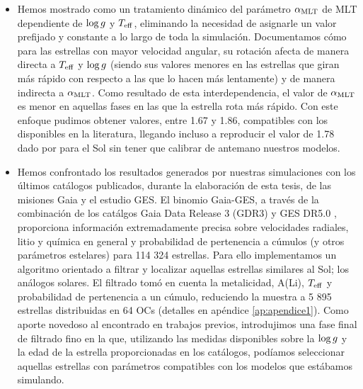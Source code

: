 \begin{itemize}
    \item Hemos mostrado como un tratamiento dinámico del parámetro $\alpha_{\mathrm{MLT}}$ de MLT dependiente de $\mathrm{log} \, g$ y $T_{\mathrm{eff}}$, eliminando la necesidad de asignarle un valor prefijado y constante a lo largo de toda la simulación. Documentamos cómo para las estrellas con mayor velocidad angular, su rotación afecta de manera directa a $T_{\mathrm{eff}}$ y $\mathrm{log} \, g$ (siendo sus valores menores en las estrellas que giran más rápido con respecto a las que lo hacen más lentamente) y de manera indirecta a $\alpha_{\mathrm{MLT}}$. Como resultado de esta interdependencia, el valor de $\alpha_{\mathrm{MLT}}$ es menor en aquellas fases en las que la estrella rota más rápido. Con este enfoque pudimos obtener valores, entre 1.67 y 1.86, compatibles con los disponibles en la literatura, llegando incluso a reproducir el valor de 1.78 dado por \cite{Sonoi2018} para el Sol sin tener que calibrar de antemano nuestros modelos.
    \item Hemos confrontado los resultados generados por nuestras simulaciones con los últimos catálogos publicados, durante la elaboración de esta tesis, de las misiones Gaia y el estudio GES. El binomio Gaia-GES, a través de la combinación de los catálgos Gaia Data Release 3 (GDR3) \citep{Brown2022} y GES DR5.0 \citep{Gilmore2022}, proporciona información extremadamente precisa sobre velocidades radiales, litio y química en general y probabilidad de pertenencia a cúmulos (y otros parámetros estelares) para 114 324 estrellas. Para ello implementamos un algoritmo orientado a filtrar y localizar aquellas estrellas similares al Sol; los análogos solares. El filtrado tomó en cuenta la metalicidad, A(Li), $T_{\mathrm{eff}}$ y probabilidad de pertenencia a un cúmulo, reduciendo la muestra a 5 895 estrellas distribuidas en 64 OCs (detalles en apéndice \ref{ap:apendice1}). Como aporte novedoso al encontrado en trabajos previos, introdujimos una fase final de filtrado fino en la que, utilizando las medidas disponibles sobre la $\mathrm{log} \, g$ y la edad de la estrella proporcionadas en los catálogos, podíamos seleccionar aquellas estrellas con parámetros compatibles con los modelos que estábamos simulando.
\end{itemize}

